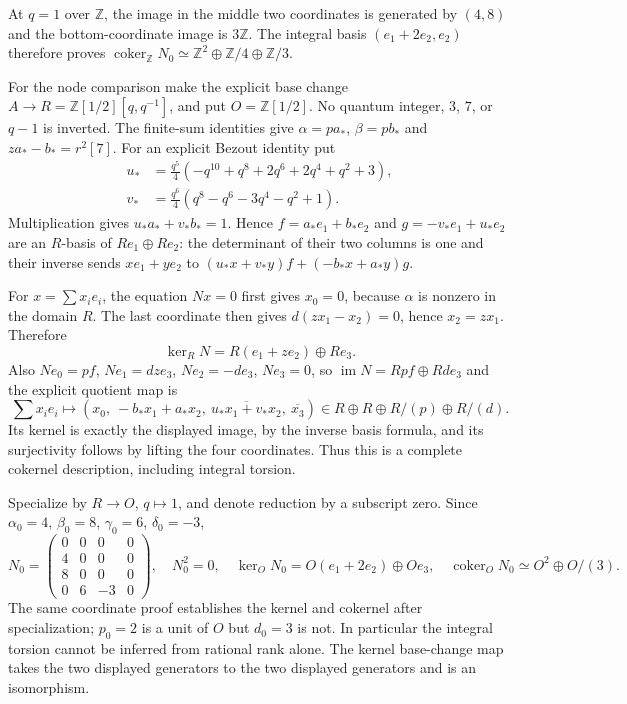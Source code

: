 At $q=1$ over $\mathbb Z$, the image in the middle two coordinates
is generated by $(4,8)$ and the bottom-coordinate image is $3\mathbb Z$.
The integral basis $(e_1+2e_2,e_2)$ therefore proves
$\operatorname{coker}_{\mathbb Z}N_0\simeq
\mathbb Z^2\oplus\mathbb Z/4\oplus\mathbb Z/3$.

For the node comparison make the explicit base change
$A\to R=\mathbb Z[1/2][q,q^{-1}]$, and put $O=\mathbb Z[1/2]$.
No quantum integer, $3$, $7$, or $q-1$ is inverted.
The finite-sum identities give $\alpha=pa_*$, $\beta=pb_*$ and
$za_*-b_*=r^2[7]$. For an explicit Bezout identity put
\begin{align*}
 u_*&=\frac{q^5}{4}(-q^{10}+q^8+2q^6+2q^4+q^2+3),\\
 v_*&=\frac{q^6}{4}(q^8-q^6-3q^4-q^2+1).
\end{align*}
Multiplication gives $u_*a_*+v_*b_*=1$. Hence
$f=a_*e_1+b_*e_2$ and $g=-v_*e_1+u_*e_2$ are an $R$-basis of
$Re_1\oplus Re_2$: the determinant of their two columns is one
and their inverse sends $xe_1+ye_2$ to
$(u_*x+v_*y)f+(-b_*x+a_*y)g$.

For $x=\sum x_ie_i$, the equation $Nx=0$ first gives $x_0=0$,
because $\alpha$ is nonzero in the domain $R$. The last coordinate
then gives $d(zx_1-x_2)=0$, hence $x_2=zx_1$. Therefore
\[
 \ker_RN=R(e_1+ze_2)\oplus Re_3.
\]
Also $Ne_0=pf$, $Ne_1=dz e_3$, $Ne_2=-d e_3$, $Ne_3=0$,
so $\operatorname{im}N=Rpf\oplus Rd e_3$ and the explicit quotient
map is
\[
 \sum x_ie_i\longmapsto
 (x_0,\ -b_*x_1+a_*x_2,\ 
  \overline{u_*x_1+v_*x_2},\ \overline{x_3})
 \in R\oplus R\oplus R/(p)\oplus R/(d).
\]
Its kernel is exactly the displayed image, by the inverse basis
formula, and its surjectivity follows by lifting the four coordinates.
Thus this is a complete cokernel description, including integral torsion.

Specialize by $R\to O$, $q\mapsto1$, and denote reduction by a subscript
zero. Since $\alpha_0=4$, $\beta_0=8$, $\gamma_0=6$, $\delta_0=-3$,
\[
 N_0=\begin{pmatrix}0&0&0&0\\4&0&0&0\\8&0&0&0\\0&6&-3&0\end{pmatrix},
 \quad N_0^2=0,
 \quad\ker_ON_0=O(e_1+2e_2)\oplus Oe_3,
 \quad\operatorname{coker}_ON_0\simeq O^2\oplus O/(3).
\]
The same coordinate proof establishes the kernel and cokernel after
specialization; $p_0=2$ is a unit of $O$ but $d_0=3$ is not.
In particular the integral torsion cannot be inferred from rational
rank alone. The kernel base-change map takes the two displayed
generators to the two displayed generators and is an isomorphism.

